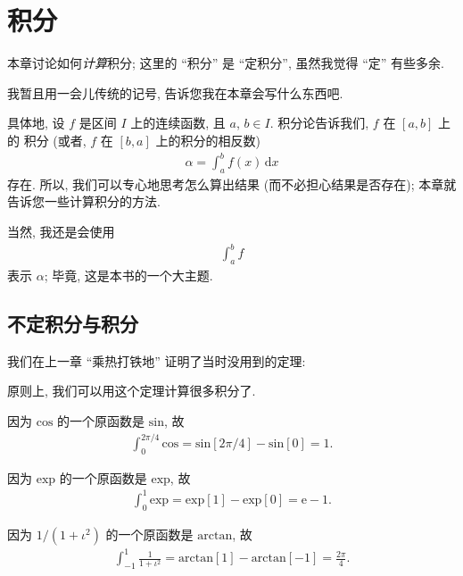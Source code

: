 \chapter{积分}

本章讨论如何\emph{计算}积分; 这里的 ``积分'' 是 ``定积分'', 虽然我觉得 ``定'' 有些多余.

我暂且用一会儿传统的记号, 告诉您我在本章会写什么东西吧.

具体地, 设 $f$ 是区间 $I$ 上的连续函数, 且 $a$, $b \in I$. 积分论告诉我们, $f$ 在 $[a, b]$ 上的 积分 (或者, $f$ 在 $[b, a]$ 上的积分的相反数)
\begin{align*}
    \alpha = \int_{a}^{b} {f(x)\,\mathrm{d}x}
\end{align*}
存在. 所以, 我们可以专心地思考怎么算出结果 (而不必担心结果是否存在); 本章就告诉您一些计算积分的方法.

当然, 我还是会使用
\begin{align*}
    \int_{a}^{b} {f}
\end{align*}
表示 $\alpha$; 毕竟, 这是本书的一个大主题.

\section{不定积分与积分}

我们在上一章 ``乘热打铁地'' 证明了当时没用到的定理:

\NewtonLeibniz*

原则上, 我们可以用这个定理计算很多积分了.

\begin{example}
    因为 $\mathrm{cos}$ 的一个原函数是 $\mathrm{sin}$, 故
    \begin{align*}
        \int_{0}^{2\pi/4} {\mathrm{cos}} = \mathrm{sin} [2\pi/4] - \mathrm{sin} [0] = 1.
    \end{align*}
\end{example}

\begin{example}
    因为 $\mathrm{exp}$ 的一个原函数是 $\mathrm{exp}$, 故
    \begin{align*}
        \int_{0}^{1} {\mathrm{exp}} = \mathrm{exp} [1] - \mathrm{exp} [0] = \mathrm{e} - 1.
    \end{align*}
\end{example}

\begin{example}
    因为 $1/(1 + \iota^2)$ 的一个原函数是 $\mathrm{arctan}$, 故
    \begin{align*}
        \int_{-1}^{1} {\frac{1}{1 + \iota^2}} = \mathrm{arctan} [1] - \mathrm{arctan} [-1] = \frac{2\pi}{4}.
    \end{align*}
\end{example}

